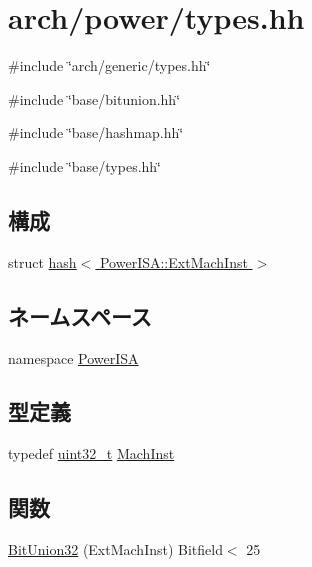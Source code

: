\hypertarget{arch_2power_2types_8hh}{
\section{arch/power/types.hh}
\label{arch_2power_2types_8hh}
}
{\ttfamily \#include \char`\"{}arch/generic/types.hh\char`\"{}}\par
{\ttfamily \#include \char`\"{}base/bitunion.hh\char`\"{}}\par
{\ttfamily \#include \char`\"{}base/hashmap.hh\char`\"{}}\par
{\ttfamily \#include \char`\"{}base/types.hh\char`\"{}}\par
\subsection*{構成}
\begin{DoxyCompactItemize}
\item 
struct \hyperlink{structhash_3_01PowerISA_1_1ExtMachInst_01_4}{hash$<$ PowerISA::ExtMachInst $>$}
\end{DoxyCompactItemize}
\subsection*{ネームスペース}
\begin{DoxyCompactItemize}
\item 
namespace \hyperlink{namespacePowerISA}{PowerISA}
\end{DoxyCompactItemize}
\subsection*{型定義}
\begin{DoxyCompactItemize}
\item 
typedef \hyperlink{Type_8hh_a435d1572bf3f880d55459d9805097f62}{uint32\_\-t} \hyperlink{namespacePowerISA_a301c22ea09fa33dcfe6ddf22f203699c}{MachInst}
\end{DoxyCompactItemize}
\subsection*{関数}
\begin{DoxyCompactItemize}
\item 
\hyperlink{namespacePowerISA_ae6138c1a89d88d75d610318542516cc3}{BitUnion32} (ExtMachInst) Bitfield$<$ 25
\end{DoxyCompactItemize}

